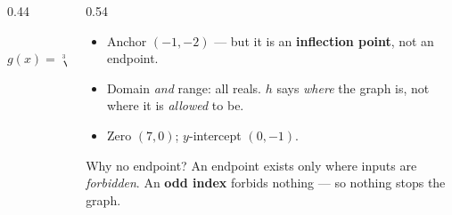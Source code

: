\documentclass[aspectratio=169, 11pt]{beamer}
\newcommand{\lgrid}[4]{%
  \draw[step=1, linegray!45, thin] (#1,#3) grid (#2,#4);
  \draw[->, thick, charcoal] (#1,0)--(#2,0) node[below right, font=\tiny]{$x$};
  \draw[->, thick, charcoal] (0,#3)--(0,#4) node[left, font=\tiny]{$y$};}
\newcommand{\cbrtplot}[5]{%
  \draw[very thick, forest, domain=#2:#5, samples=70, smooth]
    plot (\x,{(#1)*pow((\x)-(#2),1/3)+(#3)});
  \draw[very thick, forest, domain=#4:#2, samples=70, smooth]
    plot (\x,{-(#1)*pow((#2)-(\x),1/3)+(#3)});}
\begin{document}
\begin{frame}[t, plain]
  \begin{columns}[T]
    \begin{column}{0.44\textwidth}
      \centering
      \\[2pt]
      {\footnotesize $g(x)=\sqrt[3]{x+1}-2$}
    \end{column}
    \begin{column}{0.54\textwidth}
      \footnotesize
      \begin{itemize}\setlength{\itemsep}{3pt}
        \item Anchor $(-1,-2)$ --- but it is an \textbf{inflection point}, not an endpoint.
        \item Domain \emph{and} range: all reals. $h$ says \emph{where} the graph is, not where it
              is \emph{allowed} to be.
        \item Zero $(7,0)$; \; $y$-intercept $(0,-1)$.
      \end{itemize}
      \vspace{2pt}
      \begin{block}{Why no endpoint?}
        An endpoint exists only where inputs are \emph{forbidden}. An \textbf{odd index} forbids
        nothing --- so nothing stops the graph.
      \end{block}
    \end{column}
  \end{columns}
\end{frame}
\end{document}
